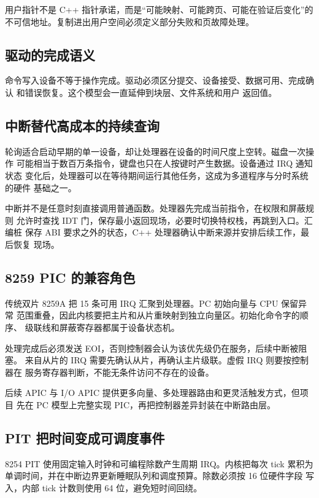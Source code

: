\begin{contractbox}
用户指针不是 C++ 指针承诺，而是“可能映射、可能跨页、可能在验证后变化”的
不可信地址。复制进出用户空间必须定义部分失败和页故障处理。
\end{contractbox}

\subsection{驱动的完成语义}

命令写入设备不等于操作完成。驱动必须区分提交、设备接受、数据可用、完成确认
和错误恢复。这个模型会一直延伸到块层、文件系统和用户  返回值。

\subsection{中断替代高成本的持续查询}

轮询适合启动早期的单一设备，却让处理器在设备的时间尺度上空转。磁盘一次操作
可能相当于数百万条指令，键盘也只在人按键时产生数据。设备通过 IRQ 通知状态
变化后，处理器可以在等待期间运行其他任务，这成为多道程序与分时系统的硬件
基础之一。

中断并不是任意时刻直接调用普通函数。处理器先完成当前指令，在权限和屏蔽规则
允许时查找 IDT 门，保存最小返回现场，必要时切换特权栈，再跳到入口。汇编桩
保存 ABI 要求之外的状态，C++ 处理器确认中断来源并安排后续工作，最后恢复
现场。

\subsection{8259 PIC 的兼容角色}

传统双片 8259A 把 15 条可用 IRQ 汇聚到处理器。PC 初始向量与 CPU 保留异常
范围重叠，因此内核要把主片和从片重映射到独立向量区。初始化命令字的顺序、
级联线和屏蔽寄存器都属于设备状态机。

处理完成后必须发送 EOI，否则控制器会认为该优先级仍在服务，后续中断被阻塞。
来自从片的 IRQ 需要先确认从片，再确认主片级联。虚假 IRQ 则要按控制器在
服务寄存器判断，不能无条件访问不存在的设备。

后续 APIC 与 I/O APIC 提供更多向量、多处理器路由和更灵活触发方式，但项目
先在 PC 模型上完整实现 PIC，再把控制器差异封装在中断路由层。

\subsection{PIT 把时间变成可调度事件}

8254 PIT 使用固定输入时钟和可编程除数产生周期 IRQ。内核把每次 tick 累积为
单调时间，并在中断边界更新睡眠队列和调度预算。除数必须按 16 位硬件字段
写入，内部 tick 计数则使用 64 位，避免短时间回绕。

